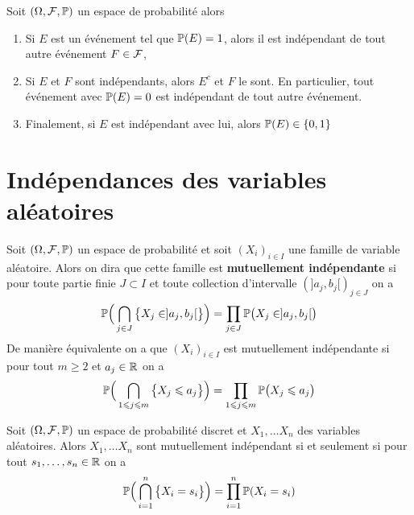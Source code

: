 \begin{lemme}
	Soit $(\Omega, \F, \P)$ un espace de probabilité alors
	\begin{enumerate}
		\item Si $E$ est un événement tel que $\P(E) = 1$, alors il est indépendant de tout autre événement $F \in \F$,
		
		\item Si $E$ et $F$ sont indépendants, alors $E^c$ et $F$ le sont. En particulier, tout événement avec $\P(E) = 0$ est indépendant de tout autre événement.
		
		\item Finalement, si $E$ est indépendant avec lui, alors $\P(E) \in \{0,1\}$
	\end{enumerate}
\end{lemme}

\section{Indépendances des variables aléatoires}

\begin{definition}
	Soit $(\Omega, \F, \P)$ un espace de probabilité et soit $(X_i)_{i \in I}$ une famille de variable aléatoire. Alors on dira que cette famille est \textbf{mutuellement indépendante} si pour toute partie finie $J \subset I$ et toute collection d'intervalle $(]a_j, b_j[)_{j \in J}$ on a
	\[
	\P \Big( \bigcap_{j \in J} \big\{X_j \in ]a_j, b_j[ \big\}\Big) = \prod_{j \in J} \P \big(X_j \in ]a_j, b_j[\big)
	\]
	De manière équivalente on a que $(X_i)_{i \in I}$ est mutuellement indépendante si pour tout $m \geqslant 2$ et $a_j \in \R$ on a
	\[
	\P \Big( \bigcap_{1 \leqslant j \leqslant m} \big\{X_j \leqslant a_j \big\}\Big) = \prod_{1 \leqslant j \leqslant m} \P \big(X_j  \leqslant a_j\big)
	\]
\end{definition}

\begin{lemme}
	Soit $(\Omega, \F, \P)$ un espace de probabilité discret et $X_1, \ldots X_n$ des variables aléatoires. Alors $X_1, \ldots X_n$ sont mutuellement indépendant si et seulement si pour tout $s_1, \ldots, s_n \in \R$ on a
	\[
	\P \Big(\bigcap_{i=1}^n \big\{ X_i = s_i \big\} \Big) = \prod_{i=1}^n \P(X_i = s_i)
	\]
\end{lemme}

